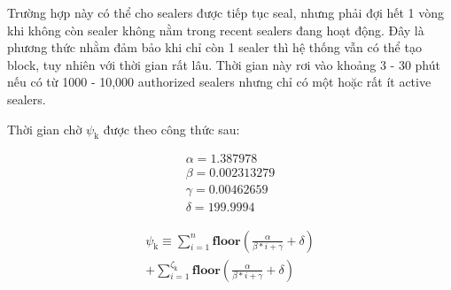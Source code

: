 \documentclass[12pt]{amsart}
\begin{document}
\begin{multicols}{2}
Trường hợp này có thể cho sealers được tiếp tục seal, nhưng phải đợi hết 1 vòng khi không còn sealer không nằm trong recent sealers đang hoạt động. Đây là phương thức nhằm đảm bảo khi chỉ còn 1 sealer thì hệ thống vẫn có thể tạo block, tuy nhiên với thời gian rất lâu. Thời gian này rơi vào khoảng 3 - 30 phút nếu có từ 1000 - 10,000 authorized sealers nhưng chỉ có một hoặc rất ít active sealers.

Thời gian chờ $\psi_{\mathrm{k}}$ được theo công thức sau:

\begin{eqnarray}
\alpha = 1.387978 \\
\beta = 0.002313279 \\
\gamma = 0.00462659 \\
\delta = 199.9994
\end{eqnarray}

\begin{multline}
\psi_{\mathrm{k}} \equiv \sum_{i=1}^{n} \mathbf{floor}(\frac{\alpha}{\beta*i+\gamma} + \delta) \\ 
+ \sum_{i=1}^{\zeta_\mathrm{k}} \mathbf{floor}(\frac{\alpha}{\beta*i+\gamma} + \delta)
\end{multline}





\end{multicols}
\end{document}

